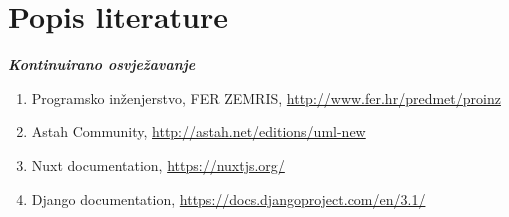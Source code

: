 \chapter*{Popis literature}
	 	
 		\textbf{\textit{Kontinuirano osvježavanje}}
		\begin{comment}
		\textit{Popisati sve reference i literaturu koja je pomogla pri ostvarivanju projekta.}
		\end{comment}
		
		
		\begin{enumerate}
			
			
			\item  Programsko inženjerstvo, FER ZEMRIS, \url{http://www.fer.hr/predmet/proinz}
			
			\item  Astah Community, \url{http://astah.net/editions/uml-new}
			
			\item  Nuxt documentation, \url{https://nuxtjs.org/}
			
			\item  Django documentation, \url{https://docs.djangoproject.com/en/3.1/}
		\end{enumerate}
		
		 